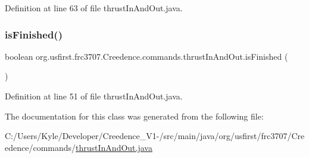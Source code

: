 Definition at line 63 of file thrust\+In\+And\+Out.\+java.

\mbox{\label{classorg_1_1usfirst_1_1frc3707_1_1_creedence_1_1commands_1_1thrust_in_and_out_aed80c89c8005eb64b63a586f78f5e3e3}} 
\subsubsection{\texorpdfstring{isFinished()}{isFinished()}}
{\footnotesize\ttfamily boolean org.\+usfirst.\+frc3707.\+Creedence.\+commands.\+thrust\+In\+And\+Out.\+is\+Finished (\begin{DoxyParamCaption}{ }\end{DoxyParamCaption})\hspace{0.3cm}{\ttfamily [protected]}}



Definition at line 51 of file thrust\+In\+And\+Out.\+java.



The documentation for this class was generated from the following file\+:\begin{DoxyCompactItemize}
\item 
C\+:/\+Users/\+Kyle/\+Developer/\+Creedence\+\_\+\+V1-\//src/main/java/org/usfirst/frc3707/\+Creedence/commands/\mbox{\hyperlink{thrust_in_and_out_8java}{thrust\+In\+And\+Out.\+java}}\end{DoxyCompactItemize}
